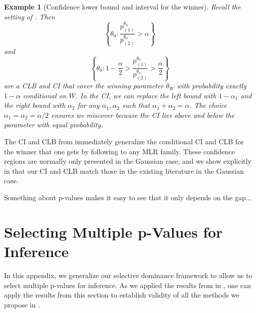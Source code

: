\documentclass{article}
\newtheorem{example}{Example}
\begin{document}
\begin{appendix}
\begin{example}[Confidence lower bound and interval for the winner] 
    \label{exm:confidence_interval}
    Recall the setting of . Then 
    \begin{equation}
        \label{eq:mlr_cond_lcb}
        \left\{ \theta_0 : \frac{p^{\theta_0}_{(1)}}{p^{\theta_0}_{(2)}} > \alpha \right\}
    \end{equation}
    and 
    \begin{equation}
        \label{eq:mlr_cond_ci}
        \left\{ \theta_0 : 1 - \frac{\alpha}{2}> \frac{p^{\theta_0}_{(1)}}{p^{\theta_0}_{(2)}} > \frac{\alpha}{2} \right\}
    \end{equation}
    are a CLB and CI that cover the winning parameter  $\theta_W$ with probability exactly $1-\alpha$ conditional on $W$. In the CI, we can replace the left bound with $1-\alpha_1$ and the right bound with $\alpha_2$ for any $\alpha_1, \alpha_2 $ such that $\alpha_1 + \alpha_2 = \alpha$. The choice $\alpha_1 = \alpha_2 = \alpha/2$ ensures we miscover because the CI lies above and below the parameter with equal probability. 
\end{example}

The CI and CLB from  immediately generalize the conditional CI and CLB for the winner that one gets by following \cite{Fithian2017} to any MLR family. These confidence regions are normally only presented in the Gaussian case, and we show explicitly in  that our CI and CLB match those in the existing literature in the Gaussian case. 

Something about p-values makes it easy to see that it only depends on the gap... 


\section{Selecting Multiple p-Values for Inference}
\label{sec:multiple_p_vals_appdx}

In this appendix, we generalize our selective dominance framework to allow us to select multiple p-values for inference. As we applied the results from  in , one can apply the results from this section to establish validity of all the methods we propose in . 


\end{appendix}
\end{document}
